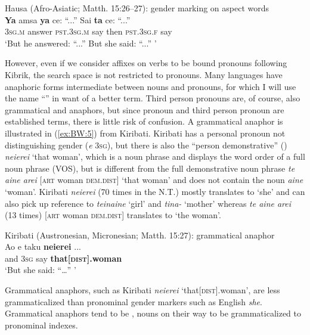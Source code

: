 \documentclass[output=collectionpaper]{langsci/langscibook}
\begin{document}
\ea\label{ex:BW:4}
Hausa (Afro-Asiatic; Matth. 15:26–27): gender marking on aspect words\\
\gll \textbf{Ya}	amsa	\textbf{ya}	ce:	``...''	Sai	\textbf{ta}	ce:	``...''\\
\textsc{3sg.m}	answer	\textsc{pst.3sg.m}	say		then	\textsc{pst.3sg.f}	say\\
\glt ‘But he answered: ``...'' But she said: ``...'' ’
\z

However, even if we consider affixes on verbs to be bound pronouns following Kibrik, the search space is not restricted to pronouns. Many languages have anaphoric forms intermediate between nouns and pronouns, for which I will use the name ``'' in want of a better term. Third person pronouns are, of course, also grammatical and anaphors, but since pronoun and third person pronoun are established terms, there is little risk of confusion. A grammatical anaphor is illustrated in (\ref{ex:BW:5}) from Kiribati. Kiribati has a personal pronoun not distinguishing gender (\textit{e} \textsc{3sg}), but there is also the “person demonstrative” (\citealt[176]{Trussel1979}) \textit{neierei} ‘that woman’, which is a noun phrase and displays the word order of a full noun phrase (VOS), but is different from the full demonstrative noun phrase \textit{te aine arei} [\textsc{art} woman \textsc{dem.dist}] ‘that woman’ and does not contain the noun \textit{aine} ‘woman’. Kiribati \textit{neierei} (70 times in the N.T.\@) mostly translates to ‘she’ and can also pick up reference to \textit{teinaine} ‘girl’ and \textit{tina-} ‘mother’ whereas \textit{te aine arei}
(13 times) [\textsc{art} woman \textsc{dem.dist}] translates to ‘the woman’.

\ea\label{ex:BW:5}
Kiribati (Austronesian, Micronesian; Matth. 15:27): grammatical anaphor\\
\gll Ao 	e 	taku 	\textbf{neierei}		... \\
and 	\textsc{3sg} 	say 	\textbf{that[\textsc{dist}].woman} \\
\glt ‘But she said: ``\ldots'' '
\z

Grammatical anaphors, such as Kiribati \textit{neierei} ‘that[\textsc{dist}].woman’, are less grammaticalized than pronominal gender markers such as English \textit{she}. Grammatical anaphors tend to be , nouns on their way to be grammaticalized to pronominal indexes.
\end{document}
